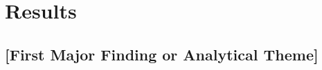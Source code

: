 \documentclass[9pt,a4paper,twocolumn,twoside]{rho-class/rho}
\begin{document}
%
%
%
%
%

\section{Results}

    \subsection{[First Major Finding or Analytical Theme]}
\end{document}
